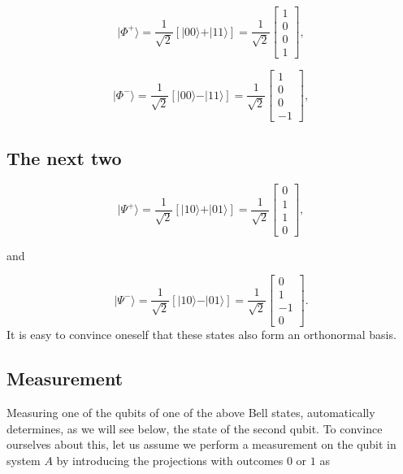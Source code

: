\documentclass[%
oneside,                 %
final,                   %
10pt]{article}
\begin{document}
\[
\vert \Phi^+\rangle = \frac{1}{\sqrt{2}}\left[\vert 00\rangle +\vert 11\rangle\right]=\frac{1}{\sqrt{2}}\begin{bmatrix} 1 \\ 0 \\ 0 \\ 1\end{bmatrix},
\]

\[
\vert \Phi^-\rangle = \frac{1}{\sqrt{2}}\left[\vert 00\rangle -\vert 11\rangle\right]=\frac{1}{\sqrt{2}}\begin{bmatrix} 1 \\ 0 \\ 0 \\ -1\end{bmatrix},
\]

\subsection{The next two}
\[
\vert \Psi^+\rangle = \frac{1}{\sqrt{2}}\left[\vert 10\rangle +\vert 01\rangle\right]=\frac{1}{\sqrt{2}}\begin{bmatrix} 0 \\ 1 \\ 1 \\ 0\end{bmatrix},
\]

and

\[
\vert \Psi^-\rangle = \frac{1}{\sqrt{2}}\left[\vert 10\rangle -\vert 01\rangle\right]=\frac{1}{\sqrt{2}}\begin{bmatrix} 0 \\ 1 \\ -1 \\ 0\end{bmatrix}.
\]
It is easy to convince oneself that these states also form an orthonormal basis. 

\subsection{Measurement}
Measuring one of the qubits of one of the above Bell states,
automatically determines, as we will see below, the state of the
second qubit. To convince ourselves about this, let us assume we perform a measurement on the qubit in system $A$ by introducing the projections with outcomes $0$ or $1$ as
\end{document}

